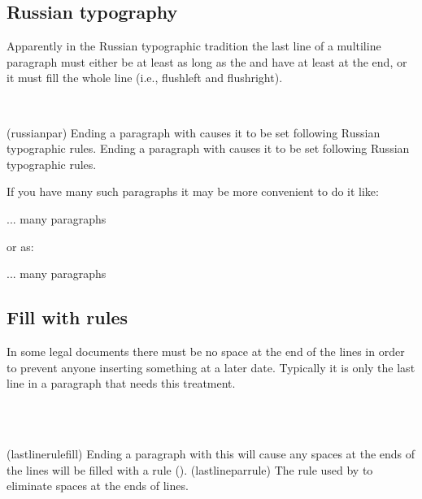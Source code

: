 \subsection{Russian typography}

    Apparently in the Russian typographic tradition the last line of a
multiline paragraph must either be at least as long as the \lnc{\parindent}
and have at least \lnc{\parindent} at the end, or it must fill 
the whole line (i.e., flushleft and flushright).

\begin{syntax}
\cmd{\russianpar} \\
\end{syntax}
\glossary(russianpar)%
  {}%
  {Ending a paragraph with  causes it to be set
   following Russian typographic rules.}
Ending a paragraph with \cmd{\russianpar} causes it to be set following
Russian typographic rules.

If you have many such paragraphs it may be more convenient to do it like:
\begin{lcode}
\let\par\russianpar
... many paragraphs
\let\par\memorigpar
\end{lcode}
or as:
\begin{lcode}
\begingroup%
\let\par\russianpar
... many paragraphs
\endgroup%
\end{lcode}


\subsection{Fill with rules}

    In some legal documents there must be no space at the end of the lines
in order to prevent anyone inserting something at a later date. Typically 
it is only the last line in a paragraph that needs this treatment.

\begin{syntax}
\cmd{\lastlinerulefill} \\
\cmd{\lastlineparrule} \\
\end{syntax}
\glossary(lastlinerulefill)%
  {}%
  {Ending a paragraph with this will cause any spaces at the ends of 
   the lines will be filled with a rule ().}
\glossary(lastlineparrule)%
  {}%
  {The rule used by  to eliminate spaces at 
   the ends of lines.}


